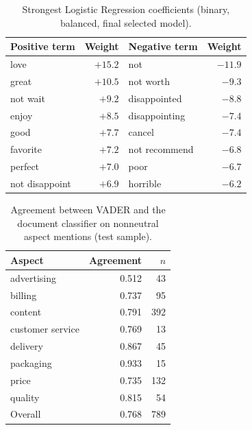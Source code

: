 \documentclass[11pt,a4paper,DIV=12]{scrartcl}
\begin{document}
\begin{table}[H]
\centering
\caption{Strongest Logistic Regression coefficients (binary, balanced, final selected model).}
\label{tab:coef}
\begin{tabular}{lr@{\qquad}lr}
\toprule
Positive term & Weight & Negative term & Weight \\
\midrule
love         & $+15.2$ & not                 & $-11.9$ \\
great        & $+10.5$ & not worth           & $-9.3$ \\
not wait     & $+9.2$  & disappointed        & $-8.8$ \\
enjoy        & $+8.5$  & disappointing       & $-7.4$ \\
good         & $+7.7$  & cancel              & $-7.4$ \\
favorite     & $+7.2$  & not recommend       & $-6.8$ \\
perfect      & $+7.0$  & poor                & $-6.7$ \\
not disappoint & $+6.9$ & horrible          & $-6.2$ \\
\bottomrule
\end{tabular}
\end{table}

\begin{table}[H]
\centering
\caption{Agreement between VADER and the document classifier on nonneutral aspect mentions (test sample).}
\label{tab:agree}
\begin{tabular}{lrr}
\toprule
Aspect & Agreement & $n$ \\
\midrule
advertising      & 0.512 & 43 \\
billing          & 0.737 & 95 \\
content          & 0.791 & 392 \\
customer service & 0.769 & 13 \\
delivery         & 0.867 & 45 \\
packaging        & 0.933 & 15 \\
price            & 0.735 & 132 \\
quality          & 0.815 & 54 \\
\midrule
Overall & 0.768 & 789 \\
\bottomrule
\end{tabular}
\end{table}
\end{document}

